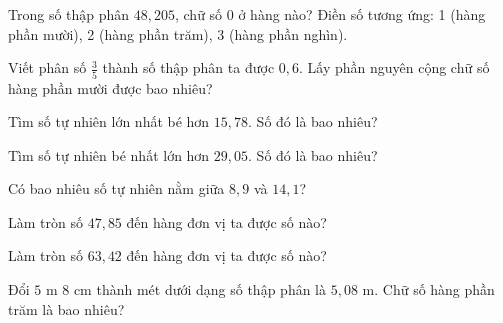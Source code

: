 
\begin{ex}
  Trong số thập phân $48{,}205$, chữ số $0$ ở hàng nào? Điền số tương ứng: 1 (hàng phần mười), 2 (hàng phần trăm), 3 (hàng phần nghìn).
\end{ex}

\begin{ex}
  Viết phân số $\frac{3}{5}$ thành số thập phân ta được $0{,}6$. Lấy phần nguyên cộng chữ số hàng phần mười được bao nhiêu?
\end{ex}

\begin{ex}
  Tìm số tự nhiên lớn nhất bé hơn $15{,}78$. Số đó là bao nhiêu?
\end{ex}

\begin{ex}
  Tìm số tự nhiên bé nhất lớn hơn $29{,}05$. Số đó là bao nhiêu?
\end{ex}

\begin{ex}
  Có bao nhiêu số tự nhiên nằm giữa $8{,}9$ và $14{,}1$?
\end{ex}

\begin{ex}
  Làm tròn số $47{,}85$ đến hàng đơn vị ta được số nào?
\end{ex}

\begin{ex}
  Làm tròn số $63{,}42$ đến hàng đơn vị ta được số nào?
\end{ex}

\begin{ex}
  Đổi $5\text{ m } 8\text{ cm}$ thành mét dưới dạng số thập phân là $5{,}08\text{ m}$. Chữ số hàng phần trăm là bao nhiêu?
\end{ex}

